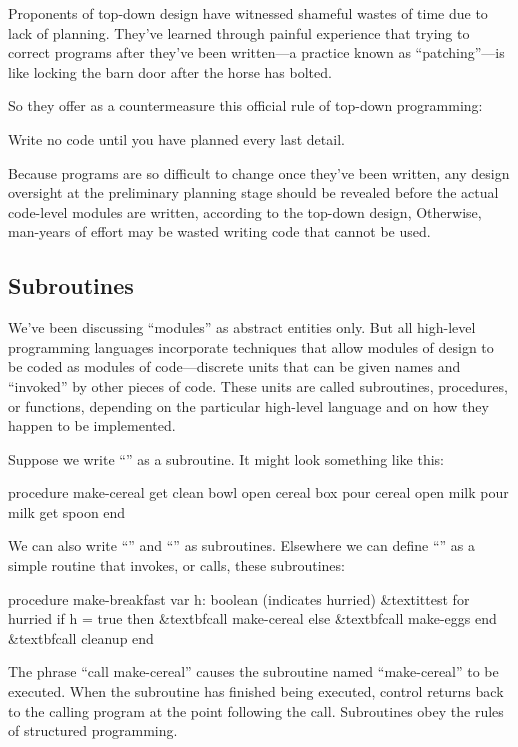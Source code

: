 Proponents of top-down design have witnessed shameful wastes of time
due to lack of planning. They've learned through painful experience
that trying to correct programs after they've been written---a
practice known as ``patching''\hy---is like locking the barn door after
the horse has bolted.

So they offer as a countermeasure this official rule of top-down
programming:
\begin{tfquot}
Write no code until you have planned every last detail.
\end{tfquot}
Because programs are so difficult to change once they've been written,
any design oversight at the preliminary planning stage should be
revealed before the actual code-level modules are written, according
to the top-down design, Otherwise, man-years of effort may be wasted
writing code that cannot be used.%
%


\subsection{Subroutines}%
%
We've been discussing ``modules'' as abstract entities only. But
all high-level programming languages incorporate techniques that allow
modules of design to be coded as modules of code---discrete units
that can be given names and ``invoked'' by other pieces of code. These
units are called subroutines, procedures, or functions, depending
on the particular high-level language and on how they happen to be
implemented.

Suppose we write ``'' as a subroutine. It might look
something like this:
\begin{Code}[fontfamily=cmss]
procedure make-cereal
   get clean bowl
   open cereal box
   pour cereal
   open milk
   pour milk
   get spoon
end
\end{Code}
We can also write ``'' and ``'' as
subroutines.  Elsewhere we can define ``'' as a
simple routine that invokes, or calls, these subroutines:

\begin{Code}[fontfamily=cmss,commandchars=\&\{\}]
procedure make-breakfast
   var h: boolean (indicates hurried)
   &textit{test for hurried}
   if h = true then
      &textbf{call make-cereal}
   else
      &textbf{call make-eggs}
   end
   &textbf{call cleanup}
end
\end{Code}
\medskip
The phrase ``call make-cereal'' causes the subroutine named
``make-cereal'' to be executed. When the subroutine has finished being
executed, control returns back to the calling program at the point
following the call.  Subroutines obey the rules of structured
programming.

